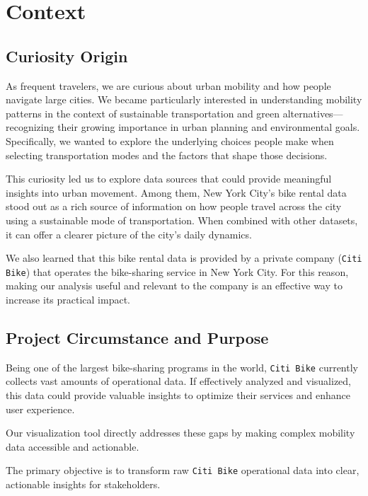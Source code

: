 \section{Context}

\subsection{Curiosity Origin}
As frequent travelers, we are curious about urban mobility and how people navigate large cities.
We became particularly interested in understanding mobility patterns in the context of sustainable transportation and green alternatives—recognizing their growing importance in urban planning and environmental goals.
Specifically, we wanted to explore the underlying choices people make when selecting transportation modes and the factors that shape those decisions.

This curiosity led us to explore data sources that could provide meaningful insights into urban movement.
Among them, New York City's bike rental data stood out as a rich source of information on how people travel across the city using a sustainable mode of transportation.
When combined with other datasets, it can offer a clearer picture of the city's daily dynamics.

We also learned that this bike rental data is provided by a private company (\texttt{Citi Bike}) that operates the bike-sharing service in New York City.
For this reason, making our analysis useful and relevant to the company is an effective way to increase its practical impact.

\subsection{Project Circumstance and Purpose}
Being one of the largest bike-sharing programs in the world, \texttt{Citi Bike} currently collects vast amounts of operational data. 
If effectively analyzed and visualized, this data could provide valuable insights to optimize their services and enhance user experience.

Our visualization tool directly addresses these gaps by making complex mobility data accessible and actionable.

The primary objective is to transform raw \texttt{Citi Bike} operational data into clear, actionable insights for stakeholders.

